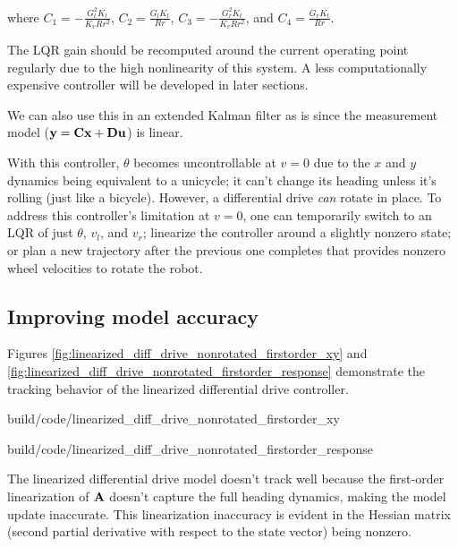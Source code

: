 \begin{theorem}
  where $C_1 = -\frac{G_l^2 K_t}{K_v R r^2}$, $C_2 = \frac{G_l K_t}{Rr}$,
  $C_3 = -\frac{G_r^2 K_t}{K_v R r^2}$, and $C_4 = \frac{G_r K_t}{Rr}$.

  The LQR gain should be recomputed around the current operating point regularly
  due to the high nonlinearity of this system. A less computationally expensive
  controller will be developed in later sections.
\end{theorem}

We can also use this in an extended Kalman filter as is since the measurement
model ($\mathbf{y} = \mathbf{C}\mathbf{x} + \mathbf{D}\mathbf{u}$) is linear.

With this \gls{controller}, $\theta$ becomes uncontrollable at $v = 0$ due to
the $x$ and $y$ dynamics being equivalent to a unicycle; it can't change its
heading unless it's rolling (just like a bicycle). However, a differential
drive \textit{can} rotate in place. To address this controller's limitation at
$v = 0$, one can temporarily switch to an LQR of just $\theta$, $v_l$, and
$v_r$; linearize the controller around a slightly nonzero state; or plan a new
trajectory after the previous one completes that provides nonzero wheel
velocities to rotate the robot.

\subsection{Improving model accuracy}

Figures \ref{fig:linearized_diff_drive_nonrotated_firstorder_xy} and
\ref{fig:linearized_diff_drive_nonrotated_firstorder_response} demonstrate the
tracking behavior of the linearized differential drive controller.

\begin{bookfigure}
  \begin{minisvg}{build/code/linearized_diff_drive_nonrotated_firstorder_xy}
    \caption{Linearized differential drive controller x-y plot (first order)}
    \label{fig:linearized_diff_drive_nonrotated_firstorder_xy}
  \end{minisvg}
  \hfill
  \begin{minisvg}{build/code/linearized_diff_drive_nonrotated_firstorder_response}
    \caption{Linearized differential drive controller response (first order)}
    \label{fig:linearized_diff_drive_nonrotated_firstorder_response}
  \end{minisvg}
\end{bookfigure}

The linearized differential drive model doesn't track well because the
first-order linearization of $\mathbf{A}$ doesn't capture the full heading
dynamics, making the \gls{model} update inaccurate. This linearization
inaccuracy is evident in the Hessian matrix (second partial derivative with
respect to the state vector) being nonzero.

